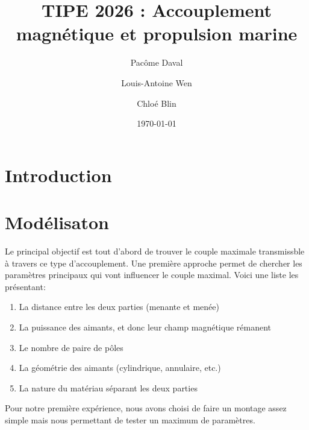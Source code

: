 \documentclass[11pt]{article}
\begin{document}
\title{TIPE 2026 : Accouplement magnétique et propulsion marine}
\author{Pacôme Daval \and Louis-Antoine Wen \and Chloé Blin}
\date{\today}
\maketitle

\newpage

\tableofcontents
\newpage

\section{Introduction}


\section{Modélisaton}
Le principal objectif est tout d'abord de trouver le couple maximale transmissble à travers ce type d'accouplement.
Une première approche permet de chercher les paramètres principaux qui vont influencer le couple maximal. Voici une liste les présentant:
\begin{enumerate}
  \item La distance entre les deux parties (menante et menée)
  \item La puissance des aimants, et donc leur champ magnétique rémanent
  \item Le nombre de paire de pôles
  \item La géométrie des aimants (cylindrique, annulaire, etc.)
  \item La nature du matériau séparant les deux parties
\end{enumerate}

Pour notre première expérience, nous avons choisi de faire un montage assez simple mais nous permettant de tester
un maximum de paramètres. 
\end{document}
